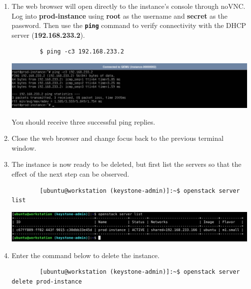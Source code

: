 \documentclass[letterpaper, 12pt]{article}
\begin{document}
\begin{enumerate}
    \item The web browser will open directly to the instance's console through noVNC. Log into \textbf{prod-instance}
    using \textbf{root} as the username and \textbf{secret} as the password. Then use the \textbf{\texttt{ping}}
    command to verify connectivity with the DHCP server (\textbf{192.168.233.2}).
    \begin{lstlisting}
        $ ping -c3 192.168.233.2
    \end{lstlisting}

    \begin{center}
        \includegraphics[width=\linewidth]{images/part2/step17.png}
    \end{center}

    \begin{notebox}
        You should receive three successful ping replies.
    \end{notebox}

    \item Close the web browser and change focus back to the previous terminal window.

    \item The instance is now ready to be deleted, but first list the servers so that the effect of the next step can be
    observed.
    \begin{lstlisting}
        [ubuntu@workstation (keystone-admin)]:~$ openstack server list
    \end{lstlisting}

    \begin{center}
        \includegraphics[width=\linewidth]{images/part2/step19.png}
    \end{center}

    \item Enter the command below to delete the instance.
    \begin{lstlisting}
        [ubuntu@workstation (keystone-admin)]:~$ openstack server delete prod-instance
    \end{lstlisting}


\end{enumerate}
\end{document}
